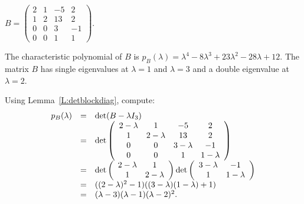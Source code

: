 \documentclass{ximera}
\begin{document}
\begin{exercise} \label{c10.2.1b}
$B = \left(\begin{array}{rrrr} 2 & 1 & -5 & 2 \\ 1 & 2 & 13 & 2 \\
0 & 0 & 3 & -1 \\ 0 & 0 & 1 & 1 \end{array}\right)$.

\begin{solution}

\ans The characteristic polynomial of $B$ is $p_B(\lambda) = \lambda^4
- 8\lambda^3 + 23\lambda^2 - 28\lambda + 12$.  The matrix $B$ has single
eigenvalues at $\lambda = 1$ and $\lambda = 3$ and a double eigenvalue at
$\lambda = 2$.

\soln Using Lemma~\ref{L:detblockdiag},
compute:
\[
\begin{array}{rcl}
p_B(\lambda) & = & \det(B - \lambda I_3) \\
& = & \det\left(\begin{array}{cccc}
2 - \lambda & 1 & -5 & 2 \\
1 & 2 - \lambda & 13 & 2 \\
0 & 0 & 3 - \lambda & -1 \\
0 & 0 & 1 & 1 - \lambda \end{array}\right) \\
& = & \det\left(\begin{array}{cc} 2 - \lambda & 1\\ 1 &2 - \lambda\end{array}\right)
\det\left(\begin{array}{cc} 3 - \lambda & -1\\ 1 &1 - \lambda\end{array}\right) \\
& = & ((2 - \lambda)^2 - 1)((3 - \lambda)(1 - \lambda) + 1) \\
& = & (\lambda - 3)(\lambda - 1)(\lambda - 2)^2.
\end{array}
\]

\end{solution}
\end{exercise}
\end{document}
